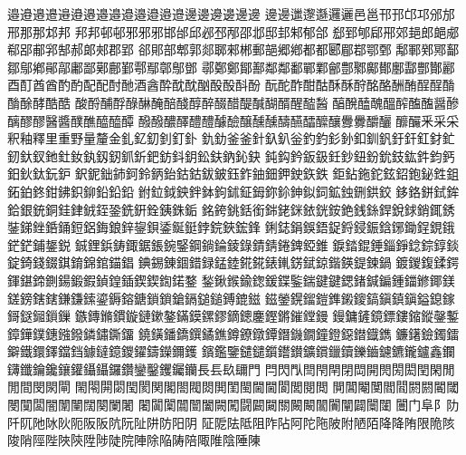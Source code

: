 邉󠄁邉󠄂邉󠄃邉󠄄邉󠄅邉󠄆邉󠄇邉󠄈邉󠄉邉󠄊邉󠄋邉󠄌邉󠄍邉󠄎邊󠄀邊󠄁邊󠄂邊󠄃邊󠄄邊󠄅
邊󠄆邊󠄇邋󠄀邌󠄀邎󠄀邏󠄀邐󠄀邑󠄀邕󠄀邗󠄀邘󠄀邙󠄀邛󠄀邠󠄀邡󠄀邢󠄀那󠄀那󠄁邥󠄀邦󠄀
邦󠄁邦󠄂邨󠄀邨󠄁邪󠄀邪󠄁邪󠄂邯󠄀邰󠄀邱󠄀邲󠄀邳󠄀邴󠄀邵󠄀邶󠄀邸󠄀邽󠄀邾󠄀郁󠄀郃󠄀
郄󠄀郅󠄀郇󠄀郈󠄀郉󠄀郊󠄀郌󠄀郎󠄀郒󠄀郕󠄀郗󠄀郘󠄀郙󠄀郛󠄀郜󠄀郝󠄀郞󠄀郟󠄀郡󠄀郢󠄀
郤󠄀郥󠄀部󠄀郫󠄀郭󠄀郯󠄀郰󠄀郲󠄀郴󠄀郵󠄀郶󠄀郷󠄀郷󠄁都󠄀都󠄁郾󠄀郿󠄀鄀󠄀鄂󠄀鄄󠄀
鄅󠄀鄆󠄀鄈󠄀鄍󠄀鄐󠄀鄒󠄀鄔󠄀鄕󠄀鄖󠄀鄗󠄀鄘󠄀鄙󠄀鄚󠄀鄜󠄀鄞󠄀鄠󠄀鄢󠄀鄣󠄀鄥󠄀鄧󠄀
鄩󠄀鄭󠄀鄭󠄁鄮󠄀鄯󠄀鄰󠄀鄰󠄁鄱󠄀鄲󠄀鄴󠄀鄶󠄀鄷󠄀鄹󠄀鄺󠄀鄼󠄀鄽󠄀酃󠄀酆󠄀酇󠄀酈󠄀
酉󠄀酊󠄀酋󠄀酋󠄁酌󠄀酌󠄁配󠄀配󠄁酎󠄀酏󠄀酒󠄀酓󠄀酔󠄀酖󠄀酖󠄁酗󠄀酘󠄀酘󠄁酙󠄀酚󠄀
酛󠄀酡󠄀酢󠄀酣󠄀酤󠄀酥󠄀酥󠄁酧󠄀酩󠄀酪󠄀酬󠄀酭󠄀酲󠄀酲󠄁酳󠄀酳󠄁酴󠄀酵󠄀酷󠄀酷󠄁
酸󠄀酹󠄀酺󠄀酻󠄀醁󠄀醂󠄀醃󠄀醅󠄀醆󠄀醇󠄀醉󠄀醊󠄀醋󠄀醍󠄀醎󠄀醐󠄀醑󠄀醒󠄀醓󠄀醔󠄀
醕󠄀醗󠄀醘󠄀醜󠄀醞󠄀醡󠄀醢󠄀醢󠄁醤󠄀醦󠄀醨󠄀醪󠄀醪󠄁醫󠄀醬󠄀醭󠄀醮󠄀醯󠄀醯󠄁醰󠄀
醱󠄀醱󠄁醲󠄀醳󠄀醴󠄀醴󠄁醵󠄀醶󠄀醸󠄀醺󠄀醺󠄁醻󠄀醼󠄀醽󠄀醿󠄀釀󠄀釁󠄀釁󠄁釂󠄀釃󠄀
釄󠄀釅󠄀釆󠄀采󠄀采󠄁釈󠄀釉󠄀釋󠄀里󠄀重󠄀野󠄀量󠄀釐󠄀金󠄀釓󠄀釔󠄀釖󠄀釗󠄀釘󠄀釙󠄀
釚󠄀釛󠄀釜󠄀釜󠄁針󠄀釞󠄀釟󠄀釡󠄀釣󠄀釣󠄁釤󠄀釥󠄀釦󠄀釧󠄀釩󠄀釪󠄀釬󠄀釭󠄀釮󠄀釯󠄀
釰󠄀釱󠄀釵󠄀釶󠄀釷󠄀釹󠄀釻󠄀釼󠄀釼󠄁釽󠄀釿󠄀鈀󠄀鈁󠄀鈄󠄀鈅󠄀鈆󠄀鈇󠄀鈉󠄀鈊󠄀鈌󠄀
鈍󠄀鈎󠄀鈐󠄀鈑󠄀鈒󠄀鈓󠄀鈔󠄀鈕󠄀鈖󠄀鈗󠄀鈘󠄀鈜󠄀鈝󠄀鈞󠄀鈣󠄀鈤󠄀鈥󠄀鈦󠄀鈨󠄀鈩󠄀
鈬󠄀鈮󠄀鈯󠄀鈰󠄀鈳󠄀鈴󠄀鈵󠄀鈶󠄀鈷󠄀鈷󠄁鈸󠄀鈹󠄀鈺󠄀鈼󠄀鈾󠄀鈿󠄀鉀󠄀鉂󠄀鉃󠄀鉄󠄀
鉅󠄀鉆󠄀鉇󠄀鉈󠄀鉉󠄀鉊󠄀鉋󠄀鉍󠄀鉎󠄀鉏󠄀鉐󠄀鉑󠄀鉖󠄀鉗󠄀鉘󠄀鉙󠄀鉚󠄀鉛󠄀鉛󠄁鉛󠄂
鉜󠄀鉝󠄀鉞󠄀鉠󠄀鉡󠄀鉢󠄀鉤󠄀鉥󠄀鉦󠄀鉧󠄀鉨󠄀鉩󠄀鉮󠄀鉯󠄀鉰󠄀鉱󠄀鉵󠄀鉶󠄀鉷󠄀鉸󠄀
鉹󠄀鉻󠄀鉼󠄀鉽󠄀鉾󠄀鉿󠄀銀󠄀銃󠄀銅󠄀銈󠄀銉󠄀銊󠄀銍󠄀銎󠄀銑󠄀銒󠄀銓󠄀銕󠄀銖󠄀銗󠄀
銘󠄀銙󠄀銚󠄀銛󠄀銜󠄀銟󠄀銠󠄀銤󠄀銥󠄀銧󠄀銨󠄀銫󠄀銭󠄀銯󠄀銲󠄀銳󠄀銶󠄀銷󠄀銸󠄀銹󠄀
銺󠄀銻󠄀銼󠄀銽󠄀銿󠄀鋀󠄀鋁󠄀鋂󠄀鋃󠄀鋅󠄀鋆󠄀鋇󠄀鋈󠄀鋋󠄀鋌󠄀鋍󠄀鋎󠄀鋏󠄀鋐󠄀鋒󠄀
鋓󠄀鋕󠄀鋗󠄀鋘󠄀鋙󠄀鋜󠄀鋝󠄀鋟󠄀鋠󠄀鋡󠄀鋣󠄀鋤󠄀鋥󠄀鋧󠄀鋨󠄀鋩󠄀鋩󠄁鋪󠄀鋬󠄀鋭󠄀
鋮󠄀鋰󠄀鋲󠄀鋳󠄀鋷󠄀鋸󠄀鋹󠄀鋺󠄀鋻󠄀鋼󠄀鋿󠄀錀󠄀錂󠄀錄󠄀錆󠄀錆󠄁錈󠄀錍󠄀錏󠄀錐󠄀
錑󠄀錔󠄀錕󠄀錘󠄀錙󠄀錚󠄀錜󠄀錝󠄀錞󠄀錟󠄀錠󠄀錡󠄀錢󠄀錣󠄀錤󠄀錥󠄀錦󠄀錧󠄀錨󠄀錩󠄀
錪󠄀錫󠄀錬󠄀錮󠄀錯󠄀録󠄀錳󠄀錴󠄀錵󠄀錵󠄁錶󠄀錷󠄀錺󠄀錻󠄀鍄󠄀鍇󠄀鍈󠄀鍉󠄀鍊󠄀鍋󠄀
鍍󠄀鍐󠄀鍑󠄀鍒󠄀鍔󠄀鍕󠄀鍖󠄀鍗󠄀鍘󠄀鍚󠄀鍛󠄀鍜󠄀鍞󠄀鍠󠄀鍤󠄀鍥󠄀鍥󠄁鍧󠄀鍩󠄀鍪󠄀
鍫󠄀鍬󠄀鍭󠄀鍮󠄀鍯󠄀鍰󠄀鍱󠄀鍳󠄀鍴󠄀鍵󠄀鍵󠄁鍶󠄀鍺󠄀鍼󠄀鍽󠄀鍾󠄀鍿󠄀鎀󠄀鎁󠄀鎂󠄀
鎈󠄀鎊󠄀鎋󠄀鎋󠄁鎌󠄀鎌󠄁鎍󠄀鎏󠄀鎒󠄀鎔󠄀鎕󠄀鎖󠄀鎖󠄁鎗󠄀鎘󠄀鎚󠄀鎚󠄁鎛󠄀鎞󠄀鎡󠄀
鎡󠄁鎣󠄀鎤󠄀鎦󠄀鎧󠄀鎨󠄀鎩󠄀鎫󠄀鎬󠄀鎭󠄀鎮󠄀鎮󠄁鎰󠄀鎴󠄀鎵󠄀鎶󠄀鎹󠄀鎺󠄀鎻󠄀鏁󠄀
鏃󠄀鏄󠄀鏅󠄀鏆󠄀鏇󠄀鏈󠄀鏉󠄀鏊󠄀鏋󠄀鏌󠄀鏍󠄀鏐󠄀鏑󠄀鏓󠄀鏖󠄀鏗󠄀鏘󠄀鏙󠄀鏜󠄀鏝󠄀
鏝󠄁鏞󠄀鏟󠄀鏡󠄀鏢󠄀鏤󠄀鏥󠄀鏦󠄀鏧󠄀鏨󠄀鏱󠄀鏵󠄀鏷󠄀鏸󠄀鏹󠄀鏺󠄀鏻󠄀鏽󠄀鐁󠄀鐂󠄀
鐃󠄀鐄󠄀鐇󠄀鐈󠄀鐉󠄀鐍󠄀鐎󠄀鐏󠄀鐐󠄀鐓󠄀鐔󠄀鐕󠄀鐖󠄀鐗󠄀鐘󠄀鐙󠄀鐚󠄀鐟󠄀鐡󠄀鐫󠄀
鐮󠄀鐯󠄀鐱󠄀鐲󠄀鐳󠄀鐴󠄀鐵󠄀鐶󠄀鐸󠄀鐺󠄀鐺󠄁鐻󠄀鐽󠄀鐿󠄀鑁󠄀鑃󠄀鑄󠄀鑅󠄀鑈󠄀鑊󠄀
鑌󠄀鑑󠄀鑒󠄀鑓󠄀鑓󠄁鑕󠄀鑙󠄀鑚󠄀鑛󠄀鑜󠄀鑞󠄀鑟󠄀鑠󠄀鑡󠄀鑢󠄀鑣󠄀鑨󠄀鑪󠄀鑫󠄀鑭󠄀
鑮󠄀鑯󠄀鑰󠄀鑱󠄀鑲󠄀鑵󠄀鑷󠄀鑷󠄁鑼󠄀鑽󠄀鑾󠄀鑿󠄀钁󠄀钃󠄀钄󠄀長󠄀镸󠄀镹󠄀镾󠄀門󠄀
閂󠄀閃󠄀閄󠄀閆󠄀閇󠄀閈󠄀閉󠄀閊󠄀開󠄀閌󠄀閍󠄀閎󠄀閏󠄀閑󠄀閒󠄀閒󠄁間󠄀閔󠄀閖󠄀閘󠄀
閙󠄀閝󠄀閞󠄀閟󠄀閠󠄀閡󠄀関󠄀閣󠄀閤󠄀閥󠄀閦󠄀閧󠄀閨󠄀閩󠄀閫󠄀閫󠄁閬󠄀閭󠄀閱󠄀閲󠄀
閴󠄀閶󠄀閹󠄀閺󠄀閻󠄀閻󠄁閼󠄀閼󠄁閽󠄀閾󠄀閿󠄀闃󠄀闆󠄀闇󠄀闈󠄀闉󠄀闊󠄀闋󠄀闌󠄀闍󠄀
闍󠄁闐󠄀闑󠄀闒󠄀闓󠄀闔󠄀闕󠄀闖󠄀闘󠄀闙󠄀闚󠄀關󠄀闝󠄀闞󠄀闟󠄀闠󠄀闡󠄀闢󠄀闤󠄀闥󠄀
闦󠄀门󠄀阜󠄀阝󠄀阞󠄀阡󠄀阢󠄀阤󠄀阥󠄀阦󠄀阨󠄀阪󠄀阪󠄁阬󠄀阮󠄀阯󠄀阱󠄀防󠄀阳󠄀阴󠄀
阷󠄀阸󠄀阹󠄀阺󠄀阻󠄀阼󠄀阽󠄀阿󠄀陀󠄀陁󠄀陂󠄀附󠄀陋󠄀陌󠄀降󠄀降󠄁陏󠄀限󠄀陒󠄀陔󠄀
陖󠄀陗󠄀陘󠄀陛󠄀陜󠄀陝󠄀陞󠄀陟󠄀陡󠄀院󠄀陣󠄀除󠄀陥󠄀陦󠄀陪󠄀陬󠄀陮󠄀陰󠄀陲󠄀陳󠄀
